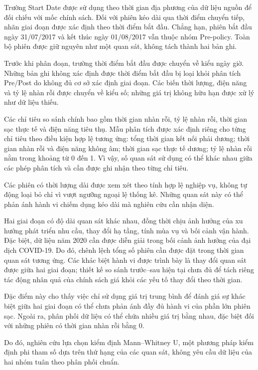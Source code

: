 \documentclass[conference,a4paper]{IEEEtran}
\begin{document}
Trường Start Date được sử dụng theo thời gian địa phương của dữ liệu nguồn để đối chiếu với mốc chính sách. Đối với phiên kéo dài qua thời điểm chuyển tiếp, nhãn giai đoạn được xác định theo thời điểm bắt đầu. Chẳng hạn, phiên bắt đầu ngày 31/07/2017 và kết thúc ngày 01/08/2017 vẫn thuộc nhóm Pre-policy. Toàn bộ phiên được giữ nguyên như một quan sát, không tách thành hai bản ghi.

Trước khi phân đoạn, trường thời điểm bắt đầu được chuyển về kiểu ngày giờ. Những bản ghi không xác định được thời điểm bắt đầu bị loại khỏi phân tích Pre/Post do không đủ cơ sở xác định giai đoạn. Các biến thời lượng, điện năng và tỷ lệ nhàn rỗi được chuyển về kiểu số; những giá trị không hữu hạn được xử lý như dữ liệu thiếu.

Các chỉ tiêu so sánh chính bao gồm thời gian nhàn rỗi, tỷ lệ nhàn rỗi, thời gian sạc thực tế và điện năng tiêu thụ. Mẫu phân tích được xác định riêng cho từng chỉ tiêu theo điều kiện hợp lệ tương ứng: tổng thời gian kết nối phải dương; thời gian nhàn rỗi và điện năng không âm; thời gian sạc thực tế dương; tỷ lệ nhàn rỗi nằm trong khoảng từ 0 đến 1. Vì vậy, số quan sát sử dụng có thể khác nhau giữa các phép phân tích và cần được ghi nhận theo từng chỉ tiêu.

Các phiên có thời lượng dài được xem xét theo tính hợp lệ nghiệp vụ, không tự động loại bỏ chỉ vì vượt ngưỡng ngoại lệ thống kê. Những quan sát này có thể phản ánh hành vi chiếm dụng kéo dài mà nghiên cứu cần nhận diện.

Hai giai đoạn có độ dài quan sát khác nhau, đồng thời chịu ảnh hưởng của xu hướng phát triển nhu cầu, thay đổi hạ tầng, tính mùa vụ và bối cảnh vận hành. Đặc biệt, dữ liệu năm 2020 cần được diễn giải trong bối cảnh ảnh hưởng của đại dịch COVID-19. Do đó, chênh lệch tổng số phiên cần được đặt trong thời gian quan sát tương ứng. Các khác biệt hành vi được trình bày là thay đổi quan sát được giữa hai giai đoạn; thiết kế so sánh trước–sau hiện tại chưa đủ để tách riêng tác động nhân quả của chính sách giá khỏi các yếu tố thay đổi theo thời gian.

Đặc điểm này cho thấy việc chỉ sử dụng giá trị trung bình để đánh giá sự khác biệt giữa hai giai đoạn có thể chưa phản ánh đầy đủ hành vi của phần lớn phiên sạc. Ngoài ra, phân phối dữ liệu có thể chứa nhiều giá trị bằng nhau, đặc biệt đối với những phiên có thời gian nhàn rỗi bằng 0.

Do đó, nghiên cứu lựa chọn kiểm định Mann–Whitney U, một phương pháp kiểm định phi tham số dựa trên thứ hạng của các quan sát, không yêu cầu dữ liệu của hai nhóm tuân theo phân phối chuẩn.
\end{document}
